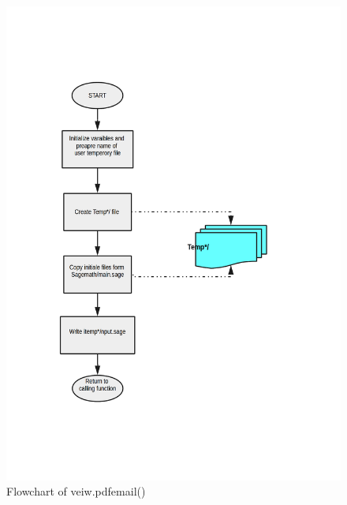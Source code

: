 \begin{figure}[H]
\centering \includegraphics[scale=0.27]{images/flowchartpdf.png}
\caption{Flowchart of veiw.pdfemail()}
\label{fig:FD4}
\end{figure}


